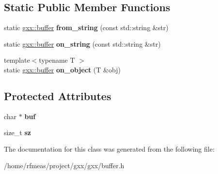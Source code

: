 \subsection*{Static Public Member Functions}
\begin{DoxyCompactItemize}
\item 
static \hyperlink{classgxx_1_1buffer}{gxx\+::buffer} {\bfseries from\+\_\+string} (const std\+::string \&str)\hypertarget{classgxx_1_1buffer_ad66a56c6f559991a66b4fd88bad79f63}{}\label{classgxx_1_1buffer_ad66a56c6f559991a66b4fd88bad79f63}

\item 
static \hyperlink{classgxx_1_1buffer}{gxx\+::buffer} {\bfseries on\+\_\+string} (const std\+::string \&str)\hypertarget{classgxx_1_1buffer_a9606de5a1ece5a0d81d5c47a99cdf68d}{}\label{classgxx_1_1buffer_a9606de5a1ece5a0d81d5c47a99cdf68d}

\item 
{\footnotesize template$<$typename T $>$ }\\static \hyperlink{classgxx_1_1buffer}{gxx\+::buffer} {\bfseries on\+\_\+object} (T \&obj)\hypertarget{classgxx_1_1buffer_a96279b8e4c96eb322d7bb589fe6f7932}{}\label{classgxx_1_1buffer_a96279b8e4c96eb322d7bb589fe6f7932}

\end{DoxyCompactItemize}
\subsection*{Protected Attributes}
\begin{DoxyCompactItemize}
\item 
char $\ast$ {\bfseries buf}\hypertarget{classgxx_1_1buffer_a8fdf505343749bc0c21536b6fb00ece8}{}\label{classgxx_1_1buffer_a8fdf505343749bc0c21536b6fb00ece8}

\item 
size\+\_\+t {\bfseries sz}\hypertarget{classgxx_1_1buffer_a52bbe79e6c889e3444bb9c4c2b653f0d}{}\label{classgxx_1_1buffer_a52bbe79e6c889e3444bb9c4c2b653f0d}

\end{DoxyCompactItemize}


The documentation for this class was generated from the following file\+:\begin{DoxyCompactItemize}
\item 
/home/rfmeas/project/gxx/gxx/buffer.\+h\end{DoxyCompactItemize}
